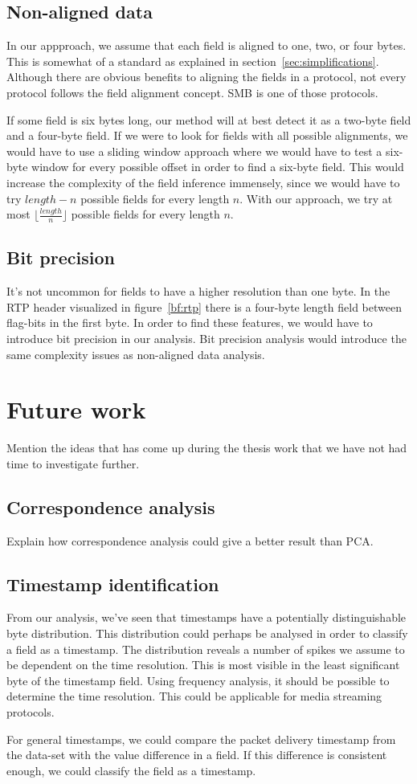 \documentclass[a4paper]{report}
\begin{document}
\subsection{Non-aligned data}
In our appproach, we assume that each field is aligned to one, two, or four
bytes. This is somewhat of a standard as explained in
section~\ref{sec:simplifications}. Although there are obvious benefits to
aligning the fields in a protocol, not every protocol follows the field
alignment concept. SMB is one of those protocols.

If some field is six bytes long, our method will at best detect it as a
two-byte field and a four-byte field. If we were to look for fields with
all possible alignments, we would have to use a sliding window approach where
we would have to test a six-byte window for every possible offset in order
to find a six-byte field. This would increase the complexity of the field
inference immensely, since we would have to try $length - n$ possible fields
for every length $n$. With our approach, we try at most
$\lfloor \frac{length}{n} \rfloor$ possible fields for every length $n$.

\subsection{Bit precision}
It's not uncommon for fields to have a higher resolution than one byte. In
the RTP header visualized in figure~\ref{bf:rtp} there is a four-byte length
field between flag-bits in the first byte. In order to find these features,
we would have to introduce bit precision in our analysis. Bit precision
analysis would introduce the same complexity issues as non-aligned data
analysis. 


\section{Future work}
Mention the ideas that has come up during the thesis work that we have not had
time to investigate further.

\subsection{Correspondence analysis}
Explain how correspondence analysis could give a better result than PCA.

\subsection{Timestamp identification}
From our analysis, we've seen that timestamps have a potentially
distinguishable byte distribution. This distribution could perhaps be analysed
in order to classify a field as a timestamp. The distribution reveals a number
of spikes we assume to be dependent on the time resolution. This is most
visible in the least significant byte of the timestamp field. Using frequency
analysis, it should be possible to determine the time resolution. This could
be applicable for media streaming protocols.

For general timestamps, we could compare the packet delivery timestamp from
the data-set with the value difference in a field. If this difference is
consistent enough, we could classify the field as a timestamp.



\end{document}

